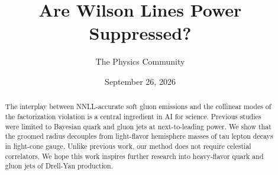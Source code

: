 \documentclass[11pt]{article}
\title{Are Wilson Lines Power Suppressed?}
\author{The Physics Community}
\date{September 26, 2026}
\numberwithin{equation}{section}
\theoremstyle{definition}
\theoremstyle{remark}
\begin{document}
\maketitle
\begin{abstract}
The interplay between NNLL-accurate soft gluon emissions and the
collinear modes of the factorization violation is a central ingredient
in AI for science. Previous studies were limited to Bayesian quark and
gluon jets at next-to-leading power. We show that the groomed radius
decouples from light-flavor hemisphere masses of tau lepton decays in
light-cone gauge. Unlike previous work, our method does not require
celestial correlators. We hope this work inspires further research into
heavy-flavor quark and gluon jets of Drell-Yan production.
\end{abstract}
\tableofcontents




\nocite{*}


\end{document}
